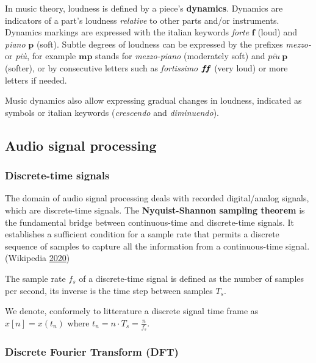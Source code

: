 \documentclass[american,]{article}
\begin{document}
In music theory, loudness is defined by a piece's \textbf{dynamics}.
Dynamics are indicators of a part's loudness \emph{relative}
to other parts and/or instruments.
Dynamics markings are expressed with the italian
keywords \emph{forte} \(\boldsymbol{f}\) (loud) and \emph{piano} \(\boldsymbol{p}\) (soft).
Subtle degrees of loudness can be expressed
by the prefixes \emph{mezzo-} or \emph{più}, for example \(\boldsymbol{mp}\) stands
for \emph{mezzo-piano} (moderately soft) and \(pi\grave{u}~\boldsymbol{p}\) (softer),
or by consecutive letters such as \emph{fortissimo} \(\boldsymbol{f}\hspace{-2pt}\boldsymbol{f}\)
(very loud) or more letters if needed.

Music dynamics also allow expressing gradual changes
in loudness, indicated as symbols or italian keywords
(\emph{crescendo} and \emph{diminuendo}).

\hypertarget{audio-signal-processing}{%
\subsection{Audio signal processing}\label{audio-signal-processing}}

\hypertarget{discrete-time-signals}{%
\subsubsection{Discrete-time signals}\label{discrete-time-signals}}

The domain of audio signal processing deals with recorded
digital/analog signals, which are discrete-time signals.
The \textbf{Nyquist-Shannon sampling theorem} is the fundamental
bridge between continuous-time and discrete-time signals.
It establishes a sufficient condition for a sample rate
that permits a discrete sequence of samples to capture
all the information from a continuous-time signal.
(Wikipedia \protect\hyperlink{ref-wiki:nyquistshannon}{2020})

The sample rate \(f_s\) of a discrete-time signal
is defined as the number of samples per second,
its inverse is the time step between samples \(T_s\).

We denote, conformely to litterature a discrete signal
time frame as \(x[n]=x(t_n)\) where
\(t_n=n\cdot T_s=\frac{n}{f_s}\).

\hypertarget{discrete-fourier-transform-dft}{%
\subsubsection{Discrete Fourier Transform (DFT)}\label{discrete-fourier-transform-dft}}
\end{document}
